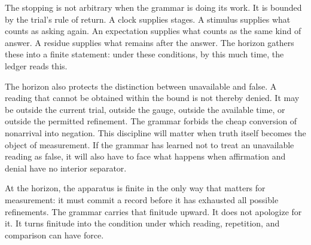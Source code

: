 The stopping is not arbitrary when the grammar is doing its work. It is
bounded by the trial's rule of return. A clock supplies stages. A
stimulus supplies what counts as asking again. An expectation supplies
what counts as the same kind of answer. A residue supplies what remains
after the answer. The horizon gathers these into a finite statement:
under these conditions, by this much time, the ledger reads this.

The horizon also protects the distinction between unavailable and false.
A reading that cannot be obtained within the bound is not thereby
denied. It may be outside the current trial, outside the gauge, outside
the available time, or outside the permitted refinement. The grammar
forbids the cheap conversion of nonarrival into negation. This discipline
will matter when truth itself becomes the object of measurement. If the
grammar has learned not to treat an unavailable reading as false, it will
also have to face what happens when affirmation and denial have no
interior separator.

At the horizon, the apparatus is finite in the only way that matters for
measurement: it must commit a record before it has exhausted all
possible refinements. The grammar carries that finitude upward. It does
not apologize for it. It turns finitude into the condition under which
reading, repetition, and comparison can have force.
